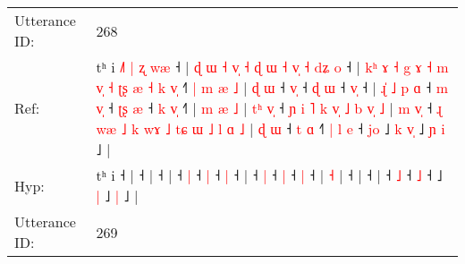 \documentclass[10pt]{article}
\DeclareRobustCommand{\hl}[1]{{\textcolor{red}{#1}}}
\begin{document}
\begin{longtable}{ll}
 \\
\midrule
Utterance ID: & 268 \\
Ref: & tʰ i\hl{ }\hl{˩}\hl{˥}\hl{ }\hl{|}\hl{ }\hl{ʐ}\hl{ }\hl{w}\hl{æ} ˧ |\hl{ }\hl{ɖ}\hl{ }\hl{ɯ}\hl{ }\hl{˧}\hl{ }\hl{v}\hl{̩}\hl{ }\hl{˧}\hl{ }\hl{ɖ}\hl{ }\hl{ɯ}\hl{ }\hl{˧}\hl{ }\hl{v}\hl{̩}\hl{ }\hl{˧}\hl{ }\hl{d}\hl{ʑ}\hl{ }\hl{o} ˧ |\hl{ }\hl{k}\hl{ʰ}\hl{ }\hl{ɤ}\hl{ }\hl{˧}\hl{ }\hl{g}\hl{ }\hl{ɤ}\hl{ }\hl{˧}\hl{ }\hl{m}\hl{ }\hl{v}\hl{̩}\hl{ }\hl{˧}\hl{ }\hl{ʈ}\hl{ʂ}\hl{ }\hl{æ}\hl{ }\hl{˧}\hl{ }\hl{k}\hl{ }\hl{v}\hl{̩} ˧\hl{˥}\hl{ }\hl{|}\hl{ }\hl{m}\hl{ }\hl{æ}\hl{ }\hl{˩} |\hl{ }\hl{ɖ}\hl{ }\hl{ɯ} ˧ \hl{v}\hl{̩} ˧\hl{ }\hl{ɖ} \hl{ɯ} ˧ \hl{v}\hl{̩} ˧ |\hl{ }\hl{ɻ}\hl{̍}\hl{ }\hl{˩}\hl{ }\hl{p}\hl{ }\hl{ɑ} ˧\hl{ }\hl{m} \hl{v}\hl{̩} ˧\hl{ }\hl{ʈ}\hl{ʂ} \hl{æ} ˧\hl{ }\hl{k} \hl{v}\hl{̩} ˧\hl{˥} |\hl{ }\hl{m}\hl{ }\hl{æ} \hl{˩} |\hl{ }\hl{t}\hl{ʰ}\hl{ }\hl{v}\hl{̩} ˧\hl{ }\hl{ɲ}\hl{ }\hl{i}\hl{ }\hl{˥}\hl{ }\hl{k}\hl{ }\hl{v}\hl{̩}\hl{ }\hl{˩}\hl{ }\hl{b}\hl{ }\hl{v}\hl{̩}\hl{ }\hl{˩} |\hl{ }\hl{m}\hl{ }\hl{v}\hl{̩} ˧\hl{ }\hl{ɻ}\hl{ }\hl{w}\hl{æ}\hl{ }\hl{˩}\hl{ }\hl{k}\hl{ }\hl{w}\hl{ɤ}\hl{ }\hl{˩}\hl{ }\hl{t}\hl{ɕ}\hl{ }\hl{ɯ}\hl{ }\hl{˩}\hl{ }\hl{l}\hl{ }\hl{ɑ}\hl{ }\hl{˩} |\hl{ }\hl{ɖ}\hl{ }\hl{ɯ} ˧\hl{ }\hl{t} \hl{ɑ} ˧\hl{˥}\hl{ }\hl{|}\hl{ }\hl{l} \hl{e} ˧\hl{ }\hl{j}\hl{o} ˩\hl{ }\hl{k} \hl{v}\hl{̩} ˩\hl{ }\hl{ɲ} \hl{i} ˩ |
 \\
Hyp: & tʰ i\hl{}\hl{}\hl{}\hl{}\hl{}\hl{}\hl{}\hl{}\hl{}\hl{} ˧ |\hl{}\hl{}\hl{}\hl{}\hl{}\hl{}\hl{}\hl{}\hl{}\hl{}\hl{}\hl{}\hl{}\hl{}\hl{}\hl{}\hl{}\hl{}\hl{}\hl{}\hl{}\hl{}\hl{}\hl{}\hl{}\hl{}\hl{} ˧ |\hl{}\hl{}\hl{}\hl{}\hl{}\hl{}\hl{}\hl{}\hl{}\hl{}\hl{}\hl{}\hl{}\hl{}\hl{}\hl{}\hl{}\hl{}\hl{}\hl{}\hl{}\hl{}\hl{}\hl{}\hl{}\hl{}\hl{}\hl{}\hl{}\hl{}\hl{}\hl{} ˧\hl{}\hl{}\hl{}\hl{}\hl{}\hl{}\hl{}\hl{}\hl{} |\hl{}\hl{}\hl{}\hl{} ˧ \hl{}\hl{|} ˧\hl{}\hl{} \hl{|} ˧ \hl{}\hl{|} ˧ |\hl{}\hl{}\hl{}\hl{}\hl{}\hl{}\hl{}\hl{}\hl{} ˧\hl{}\hl{} \hl{}\hl{|} ˧\hl{}\hl{}\hl{} \hl{|} ˧\hl{}\hl{} \hl{}\hl{|} ˧\hl{} |\hl{}\hl{}\hl{}\hl{} \hl{˧} |\hl{}\hl{}\hl{}\hl{}\hl{}\hl{} ˧\hl{}\hl{}\hl{}\hl{}\hl{}\hl{}\hl{}\hl{}\hl{}\hl{}\hl{}\hl{}\hl{}\hl{}\hl{}\hl{}\hl{}\hl{}\hl{}\hl{} |\hl{}\hl{}\hl{}\hl{}\hl{} ˧\hl{}\hl{}\hl{}\hl{}\hl{}\hl{}\hl{}\hl{}\hl{}\hl{}\hl{}\hl{}\hl{}\hl{}\hl{}\hl{}\hl{}\hl{}\hl{}\hl{}\hl{}\hl{}\hl{}\hl{}\hl{}\hl{}\hl{} |\hl{}\hl{}\hl{}\hl{} ˧\hl{}\hl{} \hl{˩} ˧\hl{}\hl{}\hl{}\hl{}\hl{} \hl{˩} ˧\hl{}\hl{}\hl{} ˩\hl{}\hl{} \hl{}\hl{|} ˩\hl{}\hl{} \hl{|} ˩ |
 \\
\midrule
Utterance ID: & 269 \\

\end{longtable}
\end{document}

